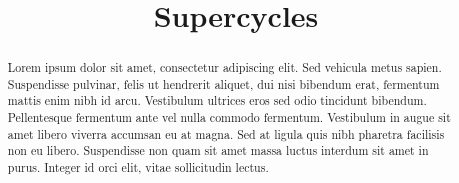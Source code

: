 \documentclass[draft,jgrga]{agutex}
\begin{document}

\title{Supercycles}








\begin{abstract}


Lorem ipsum dolor sit amet, consectetur adipiscing elit. Sed vehicula metus sapien. Suspendisse pulvinar, felis ut hendrerit aliquet, dui nisi bibendum erat, fermentum mattis enim nibh id arcu. Vestibulum ultrices eros sed odio tincidunt bibendum. Pellentesque fermentum ante vel nulla commodo fermentum. Vestibulum in augue sit amet libero viverra accumsan eu at magna. Sed at ligula quis nibh pharetra facilisis non eu libero. Suspendisse non quam sit amet massa luctus interdum sit amet in purus. Integer id orci elit, vitae sollicitudin lectus.

\end{abstract}
\end{document}
